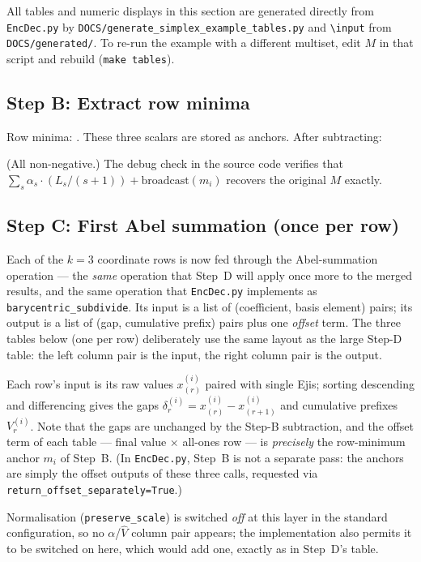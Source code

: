 \documentclass[11pt,a4paper]{article}
\newcommand{\encdecpy}{\texttt{EncDec.py}}
\begin{document}
All tables and numeric displays in this section are generated directly from
\encdecpy{} by \texttt{DOCS/generate\_simplex\_example\_tables.py} and
\texttt{\textbackslash input} from \texttt{DOCS/generated/}.  To re-run the
example with a different multiset, edit $M$ in that script and rebuild
(\texttt{make tables}).



\subsection*{Step B: Extract row minima}

Row minima: .
These three scalars are stored as anchors.  After subtracting:

(All non-negative.)  The debug check in the source code verifies that
$\sum_s \alpha_s \cdot (L_s/(s+1)) + \text{broadcast}(m_i)$ recovers
the original $M$ exactly.

\subsection*{Step C: First Abel summation (once per row)}

\noindent
Each of the $k=3$ coordinate rows is now fed through the Abel-summation
operation — the \emph{same} operation that Step~D will apply once more to the
merged results, and the same operation that \encdecpy{} implements as
\texttt{barycentric\_subdivide}.  Its input is a list of (coefficient, basis
element) pairs; its output is a list of (gap, cumulative prefix) pairs plus
one \emph{offset} term.  The three tables below (one per row) deliberately use
the same layout as the large Step-D table: the left column pair is the input,
the right column pair is the output.

Each row's input is its raw values $x^{(i)}_{(r)}$ paired with single Ejis;
sorting descending and differencing gives the gaps
$\delta^{(i)}_r = x^{(i)}_{(r)} - x^{(i)}_{(r+1)}$ and cumulative prefixes
$V^{(i)}_r$.  Note that the gaps are unchanged by the Step-B subtraction, and
the offset term of each table — final value $\times$ all-ones row — is
\emph{precisely} the row-minimum anchor $m_i$ of Step~B.  (In \encdecpy{},
Step~B is not a separate pass: the anchors are simply the offset outputs of
these three calls, requested via \texttt{return\_offset\_separately=True}.)



\noindent
Normalisation (\texttt{preserve\_scale}) is switched \emph{off} at this layer
in the standard configuration, so no $\alpha$/$\hat{V}$ column pair appears;
the \algtwobpy{} implementation also permits it to be switched on here, which
would add one, exactly as in Step~D's table.
\end{document}

